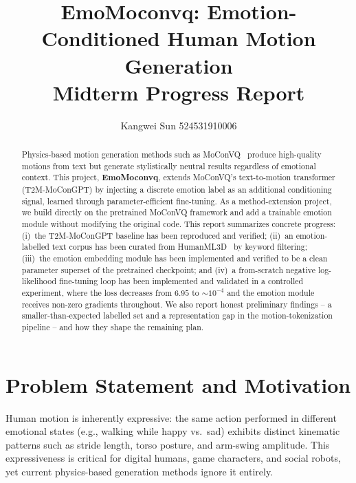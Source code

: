 \documentclass[conference]{IEEEtran}
\begin{document}
\title{EmoMoconvq: Emotion-Conditioned Human Motion Generation\\[3pt]
\large Midterm Progress Report}

\author{Kangwei Sun 524531910006}

\maketitle

\begin{abstract}
Physics-based motion generation methods such as MoConVQ~\cite{yao2023moconvq}
produce high-quality motions from text but generate stylistically neutral
results regardless of emotional context. This project, \textbf{EmoMoconvq},
extends MoConVQ's text-to-motion transformer (T2M-MoConGPT) by injecting a
discrete emotion label as an additional conditioning signal, learned through
parameter-efficient fine-tuning. As a method-extension project, we build
directly on the pretrained MoConVQ framework and add a trainable emotion
module without modifying the original code. This report summarizes concrete
progress: (i)~the T2M-MoConGPT baseline has been reproduced and verified;
(ii)~an emotion-labelled text corpus has been curated from
HumanML3D~\cite{guo2022generating} by keyword filtering; (iii)~the emotion
embedding module has been implemented and verified to be a clean parameter
superset of the pretrained checkpoint; and (iv)~a from-scratch negative
log-likelihood fine-tuning loop has been implemented and validated in a
controlled experiment, where the loss decreases from $6.95$ to $\sim\!10^{-4}$
and the emotion module receives non-zero gradients throughout. We also report
honest preliminary findings -- a smaller-than-expected labelled set and a
representation gap in the motion-tokenization pipeline -- and how they shape
the remaining plan.
\end{abstract}

\IEEEpeerreviewmaketitle

\section{Problem Statement and Motivation}
Human motion is inherently expressive: the same action performed in different
emotional states (e.g., walking while happy vs.\ sad) exhibits distinct
kinematic patterns such as stride length, torso posture, and arm-swing
amplitude. This expressiveness is critical for digital humans, game
characters, and social robots, yet current physics-based generation methods
ignore it entirely.
\end{document}
